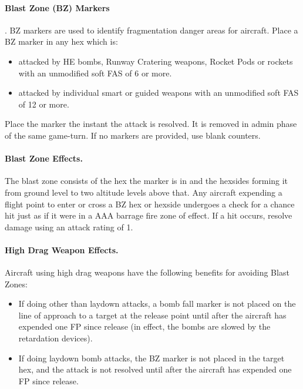 \begin{advancedrules}
\paragraph{Blast Zone (BZ) Markers}. BZ markers are used to identify fragmentation danger areas for aircraft. Place a BZ marker in any hex which is:

\begin{itemize}
    \item attacked by HE bombs, Runway Cratering weapons, Rocket Pods or rockets with an unmodified soft FAS of 6 or more.

    \item attacked by individual smart or guided weapons with an unmodified soft FAS of 12 or more.
\end{itemize}

Place the marker the instant the attack is resolved. It is removed in admin phase of the same game-turn. If no markers are provided, use blank counters.

\paragraph{Blast Zone Effects.} The blast zone consists of the hex the marker is in and the hexsides forming it from ground level to two altitude levels above that. Any aircraft expending a flight point to enter or cross a BZ hex or hexside undergoes a check for a chance hit just as if it were in a AAA barrage fire zone of effect. If a hit occurs, resolve damage using an attack rating of 1.

\paragraph{High Drag Weapon Effects.} Aircraft using high drag weapons have the following benefits for avoiding Blast Zones:

\begin{itemize}
    \item If doing other than laydown attacks, a bomb fall marker is not placed on the line of approach to a target at the release point until after the aircraft has expended one FP since release (in effect, the bombs are slowed by the retardation devices).

    \item If doing laydown bomb attacks, the BZ marker is not placed in the target hex, and the attack is not resolved until after the aircraft has expended one FP since release.
\end{itemize}

\end{advancedrules}
